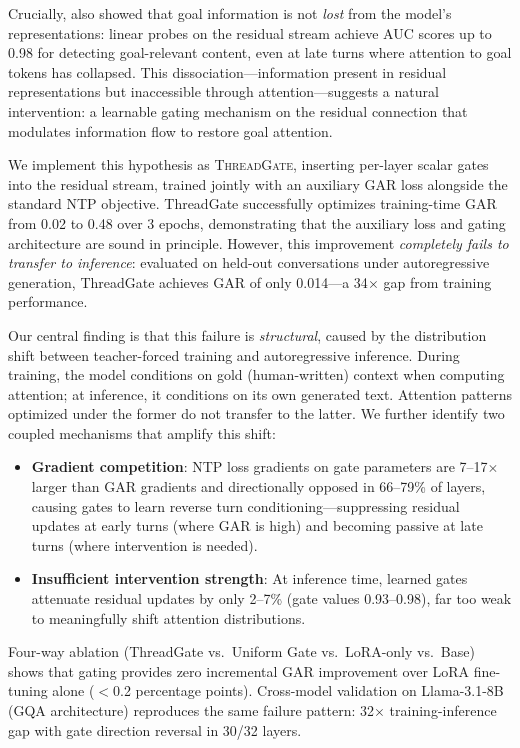 \documentclass[11pt,a4paper]{article}
\begin{document}
Crucially, \citet{dongre2026} also showed that goal information is not \emph{lost} from the model's representations: linear probes on the residual stream achieve AUC scores up to 0.98 for detecting goal-relevant content, even at late turns where attention to goal tokens has collapsed.
This dissociation---information present in residual representations but inaccessible through attention---suggests a natural intervention: a learnable gating mechanism on the residual connection that modulates information flow to restore goal attention.

We implement this hypothesis as \textsc{ThreadGate}, inserting per-layer scalar gates into the residual stream, trained jointly with an auxiliary GAR loss alongside the standard NTP objective.
ThreadGate successfully optimizes training-time GAR from 0.02 to 0.48 over 3 epochs, demonstrating that the auxiliary loss and gating architecture are sound in principle.
However, this improvement \emph{completely fails to transfer to inference}: evaluated on held-out conversations under autoregressive generation, ThreadGate achieves GAR of only 0.014---a 34$\times$ gap from training performance.

Our central finding is that this failure is \emph{structural}, caused by the distribution shift between teacher-forced training and autoregressive inference.
During training, the model conditions on gold (human-written) context when computing attention; at inference, it conditions on its own generated text.
Attention patterns optimized under the former do not transfer to the latter.
We further identify two coupled mechanisms that amplify this shift:
\begin{itemize}
    \item \textbf{Gradient competition}: NTP loss gradients on gate parameters are 7--17$\times$ larger than GAR gradients and directionally opposed in 66--79\% of layers, causing gates to learn reverse turn conditioning---suppressing residual updates at early turns (where GAR is high) and becoming passive at late turns (where intervention is needed).
    \item \textbf{Insufficient intervention strength}: At inference time, learned gates attenuate residual updates by only 2--7\% (gate values 0.93--0.98), far too weak to meaningfully shift attention distributions.
\end{itemize}

Four-way ablation (ThreadGate vs.\ Uniform Gate vs.\ LoRA-only vs.\ Base) shows that gating provides zero incremental GAR improvement over LoRA fine-tuning alone ($<$0.2 percentage points).
Cross-model validation on Llama-3.1-8B (GQA architecture) reproduces the same failure pattern: 32$\times$ training-inference gap with gate direction reversal in 30/32 layers.
\end{document}
